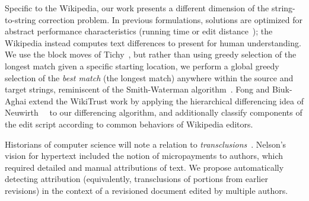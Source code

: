 Specific to the Wikipedia, our work presents a different
dimension of the string-to-string correction problem.
In previous formulations, solutions are optimized for abstract
performance characteristics (\eg running time or
edit distance~\cite{Damerau1964,Levenshtein1966});
the Wikipedia instead computes text
differences to present for human understanding.
We use the block moves of Tichy~\cite{Tichy1984}, but rather
than using greedy selection of the longest match given a specific
starting location, we perform a global greedy selection of the
\textit{best match} (\eg the longest match) anywhere within the
source and target strings, reminiscent of the Smith-Waterman
algorithm~\cite{Smith1981}.
Fong and Biuk-Aghai extend the WikiTrust work by applying
the hierarchical differencing idea of
Neuwirth~\etal~\cite{Neuwirth1992} to our differencing algorithm,
and additionally classify components
of the edit script according to common behaviors of Wikipedia editors.

Historians of computer science will note a relation
to \textit{transclusions}~\cite{Nelson81}.
Nelson's vision for hypertext included the notion
of micropayments to authors, which required detailed
and manual attributions of text.
We propose automatically detecting attribution
(equivalently, transclusions of portions from earlier revisions)
in the context of a revisioned document edited
by multiple authors.


